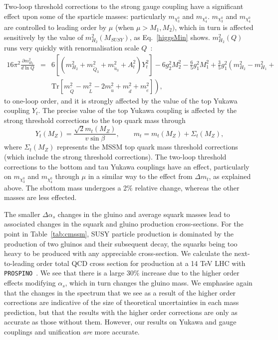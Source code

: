 \documentclass[final,3p,times,pdflatex]{elsarticle}
\begin{document}
Two-loop threshold corrections to the strong gauge coupling have a significant
effect upon some of the sparticle masses: particularly $m_{\chi_3^0}$ and
$m_{\chi_4^0}$. 
$m_{\chi_3^0}$ and
$m_{\chi_4^0}$ are controlled to leading order by $\mu$ (when $\mu>M_1, M_2)$,
which in turn is affected sensitively by the value of $m_{H_2}^2(M_{SUSY})$,
as Eq.~\ref{higgsMin} shows. $m_{H_2}^2(Q)$ runs very quickly with
renormalisation scale $Q$~\cite{Martin:1993zk}:
 \begin{eqnarray}
16 \pi^2\frac{\partial m_{H_2}^2}{d \ln Q} &=& 
6 \left[ (m_{H_2}^2 + m_{{\tilde Q}_3}^2 +
  m_{{\tilde u}_3}^2 + A_t^2)  Y_t^2  \right] - 6 g_2^2 M_2^2 - \frac{6}{5}
g_1^2 M_1^2 + \frac{3}{5}
g_1^2 \left(m_{H_2}^2-m_{H_1}^2 + \right. \nonumber \\
&&\left. \mbox{Tr}[m_{\tilde Q}^2 - m_{\tilde L}^2 - 2 
m_{\tilde u}^2 + m_{\tilde d}^2 + m_{\tilde e}^2] \right), \label{rgesA}
\end{eqnarray}
to one-loop order, and it is strongly affected by the value of the 
top Yukawa coupling $Y_t$.
The precise value of the top Yukawa coupling is affected by the strong
threshold corrections to the top quark mass
through~\cite{Pierce:1996zz}
\begin{equation}
Y_t(M_Z) = \frac{\sqrt{2} m_t(M_Z)}{v \sin \beta}, \qquad 
m_t = m_t(M_Z) + \Sigma_t(M_Z),
\end{equation}
where $\Sigma_t(M_Z)$ represents the MSSM top quark mass threshold corrections
(which include the strong threshold corrections).
The two-loop threshold corrections to the bottom and tau Yukawa couplings 
have an effect, particularly on $m_{\chi_3^0}$ and $m_{\chi_4^0}$ through
$\mu$ in a similar way to the effect from $\Delta m_t$, as explained above.
The sbottom mass undergoes a 2$\%$ relative change, whereas the other masses
are less effected.

The smaller $\Delta \alpha_s$ changes in the gluino and average squark masses
lead to associated 
changes in the squark and gluino production cross-sections. 
For the point in Table~\ref{tab:cmssm}, SUSY particle production is dominated
by the production of two gluinos and 
their subsequent decay, the squarks being too heavy to be produced with any
appreciable cross-section. We calculate the next-to-leading order total QCD
cross section for production at a 14 TeV LHC with {\tt
  PROSPINO}~\cite{Beenakker:1996ed,Beenakker:1996ch}. We see that there is
a large 30$\%$ increase due to the higher order effects modifying $\alpha_s$,
which in turn changes the gluino mass. We emphasise again that the changes in
the 
spectrum that we see as a result of the higher order corrections are
indicative of the size of theoretical uncertainties in 
each mass prediction, but that the results with the higher order corrections
are only as accurate as those without them. 
However, our results on Yukawa and gauge couplings and unification {\em are}
more accurate. 
\end{document}
